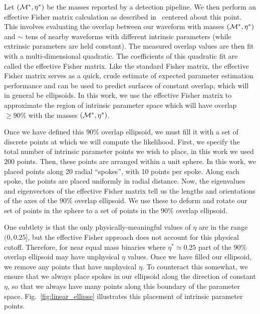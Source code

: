 Let $\left( {\cal M}^*,\eta^* \right)$ be the masses reported by a detection pipeline. We then perform an effective 
Fisher matrix calculation as described in~\cite{gwastro-mergers-HeeSuk-FisherMatrixWithAmplitudeCorrections,
gwastro-mergers-HeeSuk-CompareToPE-Aligned}
centered about this point.
This involves evaluating the overlap between our waveform with masses $\left( {\cal M}^*,\eta^* \right)$
and $\sim$ tens of nearby waveforms with different intrinsic parameters (while extrinsic parameters are held constant).
The measured overlap values are then fit with a multi-dimensional quadratic. 
The coefficients of this quadratic fit are called the effective Fisher matrix.
Like the standard Fisher matrix, the effective Fisher matrix serves as a quick, crude estimate of expected parameter
estimation performance and can be used to predict surfaces of constant overlap, which will in general be ellipsoids.
In this work, we use the effective Fisher matrix to approximate the region of intrinsic parameter space
which will have overlap $\geq 90\%$ with the masses $\left( {\cal M}^*,\eta^* \right)$.

Once we have defined this $90\%$ overlap ellipsoid, we must fill it with a set of discrete points 
at which we will compute the likelihood. First, we specify the total number of intrinsic parameter points we wish to place,
in this work we used 200 points. Then, these points are arranged within a unit sphere. In this work, we placed
points along 20 radial ``spokes'', with 10 points per spoke. Along each spoke, the points are placed 
uniformly in radial distance. Now, the eigenvalues and eigenvectors of the effective Fisher matrix tell us the lengths
and orientations of the axes of the $90\%$ overlap ellipsoid. We use these to deform and rotate our set
of points in the sphere to a set of points in the $90\%$ overlap ellipsoid.

One subtlety is that the only physically-meaningful values of $\eta$ are in the range $(0, 0.25]$, but the effective Fisher
approach does not account for this physical cutoff. Therefore, for near equal mass binaries where $\eta^* \simeq 0.25$
part of the $90\%$ overlap ellipsoid may have unphysical $\eta$ values. Once we have filled our ellipsoid, we remove
any points that have unphysical $\eta$. To counteract this somewhat, 
we ensure that we always place spokes in our ellipsoid along the direction of constant $\eta$,
so that we always have many points along this boundary of the parameter space.
Fig.~\ref{fig:linear_ellipse} illustrates this placement of intrinsic parameter points.

